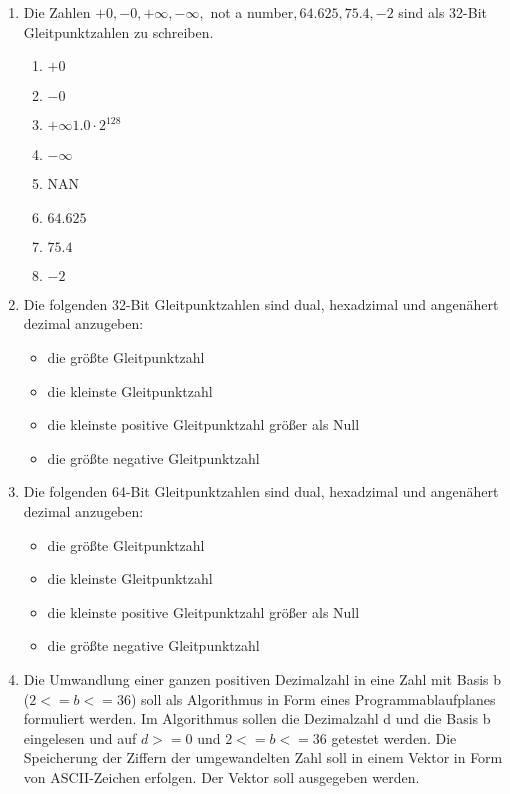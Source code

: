 \documentclass[12pt,a4paper]{scrreprt}
\begin{document}
\begin{enumerate}

\item %
Die Zahlen $+0 , -0 , +\infty , -\infty,$ not a number$, 64.625, 75.4, -2$ sind als 32-Bit Gleitpunktzahlen zu schreiben.

\begin{enumerate}
    \item $+0$
    \item $-0$
    \item $+\infty 1.0·2^128$
    \item $-\infty $
	\item NAN
    \item $64.625$
    \item $75.4$
    \item $-2$
\end{enumerate}

\item %
Die folgenden 32-Bit Gleitpunktzahlen sind dual, hexadzimal und angenähert dezimal anzugeben:

\begin{itemize}
\item die größte Gleitpunktzahl
\item die kleinste Gleitpunktzahl
\item die kleinste positive Gleitpunktzahl größer als Null
\item die größte negative Gleitpunktzahl
\end{itemize}

\item %
Die folgenden 64-Bit Gleitpunktzahlen sind dual, hexadzimal und angenähert dezimal anzugeben:

\begin{itemize}
\item die größte Gleitpunktzahl
\item die kleinste Gleitpunktzahl
\item die kleinste positive Gleitpunktzahl größer als Null
\item die größte negative Gleitpunktzahl
\end{itemize}

\item\label{umwandlungsalgo} %
Die Umwandlung einer ganzen positiven Dezimalzahl in eine Zahl mit Basis b ($2 < = b <= 36$) soll als Algorithmus in Form eines Programmablaufplanes formuliert werden. Im Algorithmus sollen die Dezimalzahl d und die Basis b eingelesen und auf $d>=0$ und $2<=b<=36$
getestet werden. Die Speicherung der Ziffern der umgewandelten Zahl soll in einem Vektor in Form von ASCII-Zeichen erfolgen. Der Vektor soll ausgegeben werden.


\end{enumerate}
\end{document}
